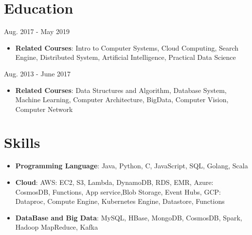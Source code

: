 \documentclass{resume}
\begin{document}



\section{Education}
 {\hfill Aug. 2017 - May 2019}
\begin{itemize}
\item{\textbf{Related Courses}: Intro to Computer Systems, Cloud Computing, Search Engine, Distributed System, Artificial Intelligence, Practical Data Science}
\end{itemize}
 {\hfill Aug. 2013 - June 2017}
\begin{itemize}
\item{\textbf{Related Courses}: Data Structures and Algorithm, Database System, Machine Learning,  Computer Architecture, BigData, Computer Vision, Computer Network}
\end{itemize}

\section{Skills}
\begin{itemize}
\item \textbf{Programming Language}: {Java, Python, C, JavaScript, SQL, Golang, Scala}
\item \textbf{Cloud}: {AWS: EC2, S3, Lambda, DynamoDB, RDS, EMR, Azure: CosmosDB, Functions, App service,Blob Storage, Event Hubs, GCP: Dataproc, Compute Engine, Kubernetes Engine, Datastore, Functions}
\item \textbf{DataBase and Big Data}: {MySQL, HBase, MongoDB, CosmosDB, Spark, Hadoop MapReduce, Kafka}
\end{itemize}
\end{document}
